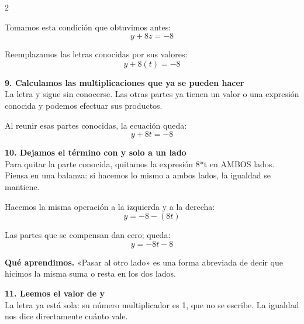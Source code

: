 \documentclass[11pt,a4paper,landscape]{article}
\begin{document}
\begin{multicols*}{2}
\begin{minipage}{\linewidth}
\par\smallskip Tomamos esta condición que obtuvimos antes:
\[y + 8z = -8\]
\par\smallskip Reemplazamos las letras conocidas por sus valores:
\[y + 8\left(t\right)=-8\]
\end{minipage}\par\medskip
\noindent\begin{minipage}{\linewidth}\textbf{9. Calculamos las multiplicaciones que ya se pueden hacer}\\[2pt]La letra y sigue sin conocerse. Las otras partes ya tienen un valor o una expresión conocida y podemos efectuar sus productos.
\par{}\par\smallskip
\par\smallskip Al reunir esas partes conocidas, la ecuación queda:
\[y + 8 t=-8\]
\end{minipage}\par\medskip
\noindent\begin{minipage}{\linewidth}\textbf{10. Dejamos el término con y solo a un lado}\\[2pt]Para quitar la parte conocida, quitamos la expresión 8*t en AMBOS lados. Piensa en una balanza: si hacemos lo mismo a ambos lados, la igualdad se mantiene.
\par\smallskip Hacemos la misma operación a la izquierda y a la derecha:
\[y=-8-\left(8 t\right)\]
\par\smallskip Las partes que se compensan dan cero; queda:
\[y=- 8 t - 8\]
\par\smallskip\textbf{Qué aprendimos.} «Pasar al otro lado» es una forma abreviada de decir que hicimos la misma suma o resta en los dos lados.
\end{minipage}\par\medskip
\noindent\begin{minipage}{\linewidth}\textbf{11. Leemos el valor de y}\\[2pt]La letra ya está sola: su número multiplicador es 1, que no se escribe. La igualdad nos dice directamente cuánto vale.

\end{minipage}
\end{multicols*}
\end{document}

